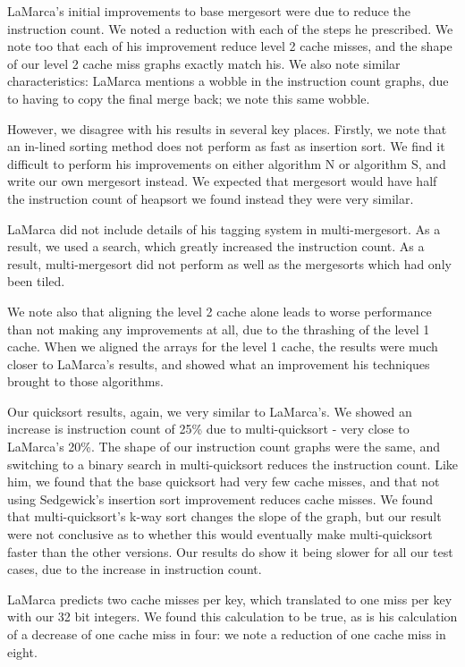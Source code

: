 LaMarca's initial improvements to base mergesort were due to reduce the
instruction count. We noted a reduction with each of the steps he prescribed. We
note too that each of his improvement reduce level 2 cache misses, and the shape
of our level 2 cache miss graphs exactly match his. We also note similar
characteristics: LaMarca mentions a wobble in the instruction count graphs, due to
having to copy the final merge back; we note this same wobble.

However, we disagree with his results in several key places. Firstly, we note
that an in-lined sorting method does not perform as fast as insertion sort. We
find it difficult to perform his improvements on either algorithm N or algorithm
S, and write our own mergesort instead. We expected that mergesort would have
half the instruction count of heapsort we found instead they were very similar.

LaMarca did not include details of his tagging system in multi-mergesort. As a
result, we used a search, which greatly increased the instruction count. As a
result, multi-mergesort did not perform as well as the mergesorts which had only
been tiled. 

We note also that aligning the level 2 cache alone leads to worse
performance than not making any improvements at all, due to the thrashing of the
level 1 cache. When we aligned the arrays for the level 1 cache, the results
were much closer to LaMarca's results, and showed what an improvement his
techniques brought to those algorithms.


Our quicksort results, again, we very similar to LaMarca's. We showed an
increase is instruction count of 25\% due to multi-quicksort - very close to
LaMarca's 20\%.  The shape of our instruction count graphs were the same, and
switching to a binary search in multi-quicksort reduces the instruction count.
Like him, we found that the base quicksort had very few cache misses, and that
not using Sedgewick's insertion sort improvement reduces cache misses. We found
that multi-quicksort's k-way sort changes the slope of the graph, but our
result were not conclusive as to whether this would eventually make
multi-quicksort faster than the other versions. Our results do show it being
slower for all our test cases, due to the increase in instruction count.

LaMarca predicts two cache misses per key, which translated to one miss per key
with our 32 bit integers. We found this calculation to be true, as is his
calculation of a decrease of one cache miss in four: we note a reduction of one
cache miss in eight.

